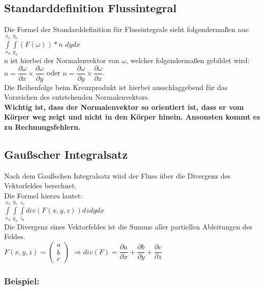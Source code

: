 \documentclass[11pt,final]{scrreprt}
\begin{document}
\subsection{Standarddefinition Flussintegral}

Die Formel der Standarddefinition für Flussintegrale sieht folgendermaßen aus:\\

$ \int\limits_{x_u}^{x_o}\int\limits_{y_u}^{y_o} (F(\omega)) * n$ $dydx$\\

n ist hierbei der Normalenvektor von $\omega$, welcher folgendermaßen gebildet wird:\\
$ n = \dfrac{\partial\omega}{\partial x} \times \dfrac{\partial\omega}{\partial y}$ oder $ n = \dfrac{\partial\omega}{\partial y} \times \dfrac{\partial\omega}{\partial x}$.\\
Die Reihenfolge beim Kreuzprodukt ist hierbei ausschlaggebend für das Vorzeichen des entstehenden Normalenvektors.\\
\textbf{Wichtig ist, dass der Normalenvektor so orientiert ist, dass er vom Körper weg zeigt und nicht in den Körper hinein. Ansonsten kommt es zu Rechnungsfehlern.}\\

\subsection{Gaußscher Integralsatz}

Nach dem Gaußschen Integralsatz wird der Fluss über die Divergenz des Vektorfeldes berechnet.\\
Die Formel hierzu lautet:\\
$ \int\limits_{x_u}^{x_o}\int\limits_{y_u}^{y_o}\int\limits_{z_u}^{z_o} div(F(x, y, z)) dzdydx $\\
Die Divergenz eines Vektorfeldes ist die Summe aller partiellen Ableitungen des Feldes.\\

$ F(x, y, z) = \left(\begin{matrix}
a\\b\\c
\end{matrix}\right)$ $\Rightarrow div(F) = \dfrac{\partial a}{\partial x} + \dfrac{\partial b}{\partial y}+\dfrac{\partial c}{\partial z}$\\

\subsubsection{Beispiel:}
\end{document}
